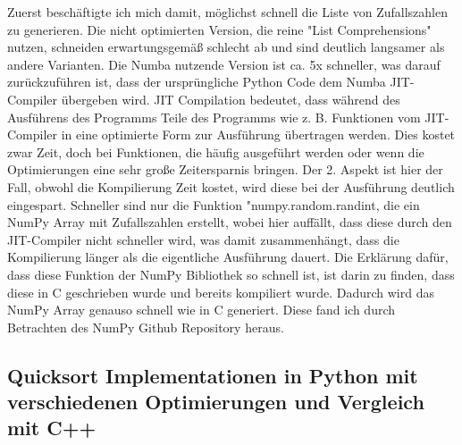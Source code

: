 \documentclass[10pt,a4paper]{article}
\begin{document}
Zuerst beschäftigte ich mich damit, möglichst schnell die Liste von Zufallszahlen zu generieren.
Die nicht optimierten Version, die reine "List Comprehensions" nutzen, schneiden erwartungsgemäß schlecht ab
und sind deutlich langsamer als andere Varianten. Die Numba nutzende Version ist ca. 5x schneller,
was darauf zurückzuführen ist, dass der ursprüngliche Python Code dem Numba JIT-Compiler übergeben wird.
JIT Compilation bedeutet, dass während des Ausführens des Programms Teile des Programms wie z. B. Funktionen
vom JIT-Compiler in eine optimierte Form zur Ausführung übertragen werden. Dies kostet zwar Zeit, doch bei
Funktionen, die häufig ausgeführt werden oder wenn die Optimierungen eine sehr große Zeitersparnis bringen.
Der 2. Aspekt ist hier der Fall, obwohl die Kompilierung Zeit kostet, wird diese bei der Ausführung deutlich eingespart.
Schneller sind nur die Funktion "numpy.random.randint, die ein NumPy Array mit Zufallszahlen erstellt,
wobei hier auffällt, dass diese durch den JIT-Compiler nicht schneller wird, was damit zusammenhängt, dass die Kompilierung
länger als die eigentliche Ausführung dauert. Die Erklärung dafür, dass diese Funktion der NumPy Bibliothek
so schnell ist, ist darin zu finden, dass diese in C geschrieben wurde und bereits kompiliert wurde. Dadurch wird
das NumPy Array genauso schnell wie in C generiert. Diese fand ich durch Betrachten des NumPy Github Repository heraus.

\subsection{Quicksort Implementationen in Python mit verschiedenen Optimierungen und Vergleich mit C++}

\begin{bchart}[min=0, max=80, scale=2.1]
    \smallskip
    \smallskip
    \smallskip
    \smallskip
    \smallskip
    \smallskip
    \smallskip
    \smallskip
    \smallskip
    \smallskip
    \smallskip
    \smallskip
\end{bchart}
\end{document}
